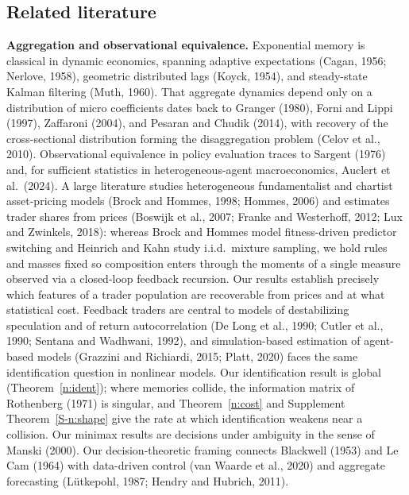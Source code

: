 \documentclass[11pt,letterpaper]{article}
\theoremstyle{definition}
\begin{document}
\subsection{Related literature}

\textbf{Aggregation and observational equivalence.} Exponential memory is classical in dynamic economics, spanning adaptive expectations (Cagan, 1956; Nerlove, 1958), geometric distributed lags (Koyck, 1954), and steady-state Kalman filtering (Muth, 1960). That aggregate dynamics depend only on a distribution of micro coefficients dates back to Granger (1980), Forni and Lippi (1997), Zaffaroni (2004), and Pesaran and Chudik (2014), with recovery of the cross-sectional distribution forming the disaggregation problem (Celov et al., 2010). Observational equivalence in policy evaluation traces to Sargent (1976) and, for sufficient statistics in heterogeneous-agent macroeconomics, Auclert et al.\ (2024). A large literature studies heterogeneous fundamentalist and chartist asset-pricing models (Brock and Hommes, 1998; Hommes, 2006) and estimates trader shares from prices (Boswijk et al., 2007; Franke and Westerhoff, 2012; Lux and Zwinkels, 2018): whereas Brock and Hommes model fitness-driven predictor switching and Heinrich and Kahn study i.i.d.\ mixture sampling, we hold rules and masses fixed so composition enters through the moments of a single measure observed via a closed-loop feedback recursion. Our results establish precisely which features of a trader population are recoverable from prices and at what statistical cost. Feedback traders are central to models of destabilizing speculation and of return autocorrelation (De Long et al., 1990; Cutler et al., 1990; Sentana and Wadhwani, 1992), and simulation-based estimation of agent-based models (Grazzini and Richiardi, 2015; Platt, 2020) faces the same identification question in nonlinear models. Our identification result is global (Theorem~\ref{n:ident}); where memories collide, the information matrix of Rothenberg (1971) is singular, and Theorem~\ref{n:cost} and Supplement Theorem~\ref{S-n:shape} give the rate at which identification weakens near a collision. Our minimax results are decisions under ambiguity in the sense of Manski (2000). Our decision-theoretic framing connects Blackwell (1953) and Le Cam (1964) with data-driven control (van Waarde et al., 2020) and aggregate forecasting (L\"utkepohl, 1987; Hendry and Hubrich, 2011).
\end{document}
